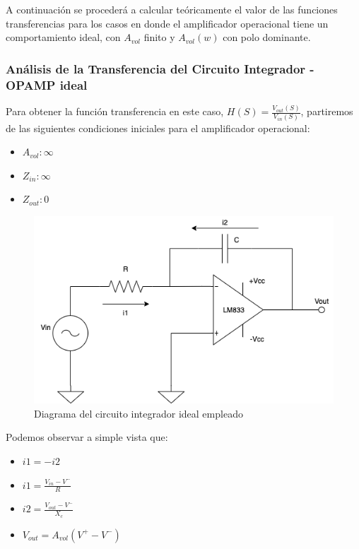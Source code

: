 A continuación se procederá a calcular teóricamente el valor de las funciones transferencias para los casos en 
donde el amplificador operacional tiene un comportamiento ideal, con $A_{vol}$ finito y $A_{vol}(w)$ con polo dominante.

\subsubsection{Análisis de la Transferencia del Circuito Integrador - OPAMP ideal}

Para obtener la función transferencia en este caso, $H(S) = \frac{V_{out} (S)}{V_{in} (S)}$, partiremos de las siguientes condiciones
iniciales para el amplificador operacional:

\begin{itemize}
	\item $A_{vol}: \infty$
	\item $Z_{in}: \infty$
	\item $Z_{out}: 0$
\end{itemize}

\begin{figure}[H]
    \centering 
    \includegraphics [scale=0.5] {../Ejercicio3-CircuitoIntegradoresyDerivadores/Imagenes/diagrama-integrador-corrientes.png} 
    \caption{Diagrama del circuito integrador ideal empleado}
    \label{fig:emptyPlotTool}
\end{figure}

Podemos observar a simple vista que:

\begin{itemize}
	\item $i1 = -i2$
	\item $i1 = \frac {V_{in}-V^{-}}{R} $
	\item $i2 = \frac {V_{out}-V^{-}}{X_c}$
	\item $V_{out} = A_{vol}(V^{+}-V^{-})$
\end{itemize}

